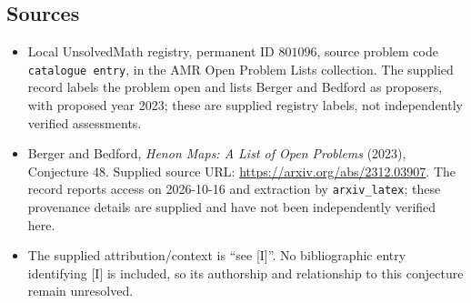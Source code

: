 \documentclass[11pt]{article}
\begin{document}
\subsection{Sources}
\begin{itemize}
\item Local UnsolvedMath registry, permanent ID \(801096\), source problem code \texttt{catalogue entry}, in the AMR Open Problem Lists collection. The supplied record labels the problem open and lists Berger and Bedford as proposers, with proposed year 2023; these are supplied registry labels, not independently verified assessments.
\item Berger and Bedford, \emph{Henon Maps: A List of Open Problems} (2023), Conjecture 48. Supplied source URL: \url{https://arxiv.org/abs/2312.03907}. The record reports access on 2026-10-16 and extraction by \texttt{arxiv\_latex}; these provenance details are supplied and have not been independently verified here.
\item The supplied attribution/context is ``see [I]''. No bibliographic entry identifying [I] is included, so its authorship and relationship to this conjecture remain unresolved.
\end{itemize}
\end{document}
